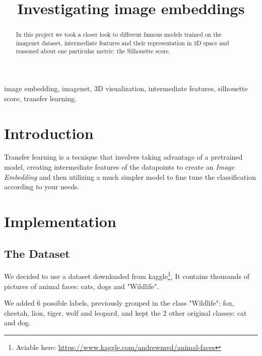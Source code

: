 \documentclass[conference]{IEEEtran}
\begin{document}
\title{Investigating image embeddings}

\author{
\and
{}
\and
{}
}

\maketitle

\begin{abstract}
In this project we took a closer look to different famous models trained on the imagenet dataset,
intermediate features and their representation in 3D space and reasoned about one particular metric: the Silhouette score.
\end{abstract}

\begin{IEEEkeywords}
image embedding, imagenet, 3D visualization, intermediate features, silhouette score, transfer learning.
\end{IEEEkeywords}

\section{Introduction}
Transfer learning is a tecnique that involves taking advantage of a pretrained model,
creating intermediate features of the datapoints to create an \emph{Image Embedding} and then
utilizing a much simpler model to fine tune the classification according to your needs.

\section{Implementation}

\subsection{The Dataset}
We decided to use a dataset downloaded from kaggle\footnote{Aviable here: \url{https://www.kaggle.com/andrewmvd/animal-faces}},
It contains thousands of pictures of animal faces: cats, dogs and "Wildlife".

We added 6 possible labels, previously grouped in the class "Wildlife":
fox, cheetah, lion, tiger, wolf and leopard, and kept the 2 other original classes: cat and dog.
\end{document}
